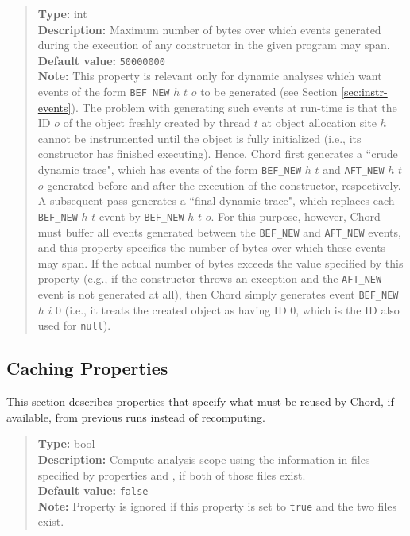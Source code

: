 \begin{quote}
{\bf Type:} int \\
{\bf Description:} Maximum number of bytes over which events generated during the execution of any constructor in the given program may span. \\
{\bf Default value:} {\tt 50000000} \\
{\bf Note:} This property is relevant only for dynamic analyses which want events of the form {\tt BEF\_NEW} $h$ $t$ $o$ to be generated (see Section \ref{sec:instr-events}).  The problem with generating such events at run-time is that the ID $o$ of the object freshly created by thread $t$ at object allocation site $h$ cannot be instrumented until the object is fully initialized (i.e., its constructor has finished executing).  Hence, Chord first generates a ``crude dynamic trace", which has events of the form {\tt BEF\_NEW} $h$ $t$ and {\tt AFT\_NEW} $h$ $t$ $o$ generated before and after the execution of the constructor, respectively.  A subsequent pass generates a ``final dynamic trace", which replaces each {\tt BEF\_NEW} $h$ $t$ event by {\tt BEF\_NEW} $h$ $t$ $o$.  For this purpose, however, Chord must buffer all events generated between the {\tt BEF\_NEW} and {\tt AFT\_NEW} events, and this property specifies the number of bytes over which these events may span.  If the actual number of bytes exceeds the value specified by this property (e.g., if the constructor throws an exception and the {\tt AFT\_NEW} event is not generated at all), then Chord simply generates event {\tt BEF\_NEW} $h$ $i$ $0$ (i.e., it treats the created object as having ID 0, which is the ID also used for {\tt null}). 
\end{quote}

\subsection{Caching Properties}
\label{sec:caching-props}

This section describes properties that specify what must be reused by Chord, if available, from previous runs instead of recomputing.

\begin{quote}
{\bf Type:} bool \\
{\bf Description:} Compute analysis scope using the information in files specified by properties  and , if both of those files exist. \\
{\bf Default value:} {\tt false} \\
{\bf Note:} Property  is ignored if this property is set to {\tt true} and the two files exist. 
\end{quote}

